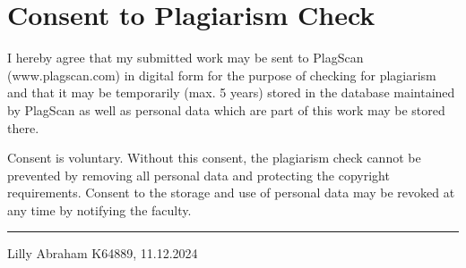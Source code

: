 \documentclass{report} %
\begin{document}
\newpage 

\chapter*{Consent to Plagiarism Check}
\vspace{1cm}

\noindent I hereby agree that my submitted work may be sent to PlagScan (www.plagscan.com) in digital form for the purpose of checking for plagiarism and that it may be temporarily (max. 5 years) stored in the database maintained by PlagScan as well as personal data which are part of this work may be stored there.

\vspace{0.5cm}

\noindent Consent is voluntary. Without this consent, the plagiarism check cannot be prevented by removing all personal data and protecting the copyright requirements. Consent to the storage and use of personal data may be revoked at any time by notifying the faculty.


\vspace{3cm}
\hfill\rule{15cm}{0.4pt} %

\begin{center}
    Lilly Abraham K64889, 11.12.2024 %
\end{center}
\end{document}
